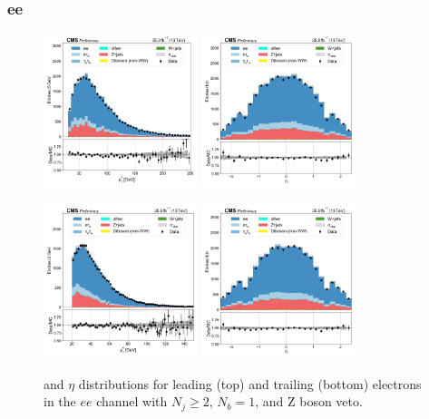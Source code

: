 
\subsubsection{ee}

\begin{figure}[htb!]
    \centering
    \includegraphics[width=0.4\textwidth]{chapters/Analysis/sectionPlots/figures/data_mc_overlays/ee_2016_cat_gt2_eq1_b_signal_linear_lepton_lepton1_pt}
    \includegraphics[width=0.4\textwidth]{chapters/Analysis/sectionPlots/figures/data_mc_overlays/ee_2016_cat_gt2_eq1_b_signal_linear_lepton_lepton1_eta}

    \includegraphics[width=0.4\textwidth]{chapters/Analysis/sectionPlots/figures/data_mc_overlays/ee_2016_cat_gt2_eq1_b_signal_linear_lepton_lepton2_pt}
    \includegraphics[width=0.4\textwidth]{chapters/Analysis/sectionPlots/figures/data_mc_overlays/ee_2016_cat_gt2_eq1_b_signal_linear_lepton_lepton2_eta}
    \caption{\pt and $\eta$ distributions for leading (top) and trailing
    (bottom) electrons in the $ee$ channel with $N_{j} \geq 2$, $N_{b}
    = 1$, and Z boson veto.}
    \label{fig:analysis:plots:ee_1_kinematic}
\end{figure}
